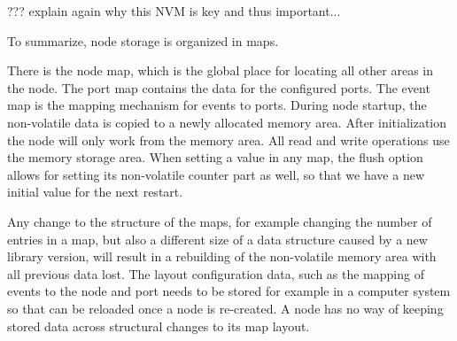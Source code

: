 ??? explain again why this NVM is key and thus important...

To summarize, node storage is organized in maps. 

There is the node map, which is the global place for locating all other areas in the node. The port map contains the data for the configured ports. The event map is the mapping mechanism for events to ports. During node startup, the non-volatile data is copied to a newly allocated memory area. After initialization the node will only work from the memory area. All read and write operations use the memory storage area. When setting a value in any map, the flush option allows for setting its non-volatile counter part as well, so that we have a new initial value for the next restart.

Any change to the structure of the maps, for example changing the number of entries in a map, but also a different size of a data structure caused by a new library version, will result in a rebuilding of the non-volatile memory area with all previous data lost. The layout configuration data, such as the mapping of events to the node and port needs to be stored for example in a computer system so that can be reloaded once a node is re-created. A node has no way of keeping stored data across structural changes to its map layout.
